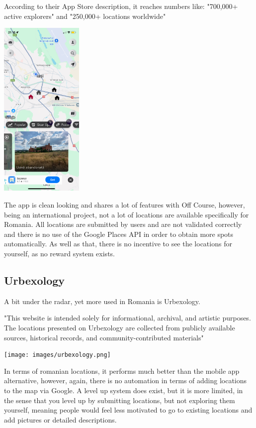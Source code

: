 \documentclass[12pt,a4paper]{report}
\begin{document}
According to their App Store description, it reaches numbers like: "700,000+ active explorers" and "250,000+ locations worldwide"~\cite{appAbandonedWorld}

\begin{center}
\includegraphics[width=0.3\textwidth]{images/abandonedworld.png}
\end{center}

The app is clean looking and shares a lot of features with Off Course, however, being an international project, not a lot of locations are available specifically for Romania. All locations are submitted by users and are not validated correctly and there is no use of the Google Places API in order to obtain more spots automatically.
As well as that, there is no incentive to see the locations for yourself, as no reward system exists. 

\subsection{Urbexology}
A bit under the radar, yet more used in Romania is Urbexology.

"This website is intended solely for informational, archival, and artistic purposes. The locations presented on Urbexology are collected from publicly available sources, historical records, and community-contributed materials"~\cite{appUrbexology}

\begin{center}
\texttt{[image: images/urbexology.png]}
\end{center}

In terms of romanian locations, it performs much better than the mobile app alternative, however, again, there is no automation in terms of adding locations to the map via Google. A level up system does exist, but it is more limited, in the sense that you level up by submitting locations, but not exploring them yourself, meaning people would feel less motivated to go to existing locations and add pictures or detailed descriptions.
\end{document}

